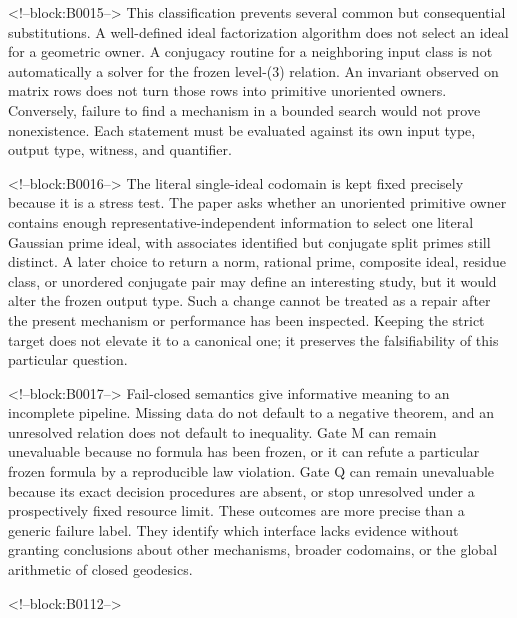 \documentclass[11pt,a4paper]{article}
\begin{document}
<!--block:B0015-->
This classification prevents several common but consequential substitutions. A well-defined ideal factorization algorithm does not select an ideal for a geometric owner. A conjugacy routine for a neighboring input class is not automatically a solver for the frozen level-(3) relation. An invariant observed on matrix rows does not turn those rows into primitive unoriented owners. Conversely, failure to find a mechanism in a bounded search would not prove nonexistence. Each statement must be evaluated against its own input type, output type, witness, and quantifier.

<!--block:B0016-->
The literal single-ideal codomain is kept fixed precisely because it is a stress test. The paper asks whether an unoriented primitive owner contains enough representative-independent information to select one literal Gaussian prime ideal, with associates identified but conjugate split primes still distinct. A later choice to return a norm, rational prime, composite ideal, residue class, or unordered conjugate pair may define an interesting study, but it would alter the frozen output type. Such a change cannot be treated as a repair after the present mechanism or performance has been inspected. Keeping the strict target does not elevate it to a canonical one; it preserves the falsifiability of this particular question.

<!--block:B0017-->
Fail-closed semantics give informative meaning to an incomplete pipeline. Missing data do not default to a negative theorem, and an unresolved relation does not default to inequality. Gate M can remain unevaluable because no formula has been frozen, or it can refute a particular frozen formula by a reproducible law violation. Gate Q can remain unevaluable because its exact decision procedures are absent, or stop unresolved under a prospectively fixed resource limit. These outcomes are more precise than a generic failure label. They identify which interface lacks evidence without granting conclusions about other mechanisms, broader codomains, or the global arithmetic of closed geodesics.

<!--block:B0112-->
\begingroup\sloppy
\end{document}
